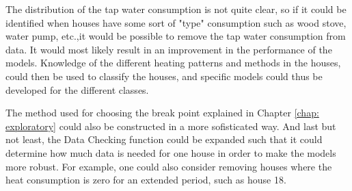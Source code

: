 \noindent The distribution of the tap water consumption is not quite clear, so if it could be identified when houses have some sort of "type" consumption such as wood stove, water pump, etc.,it would be possible to remove the tap water consumption from data. It would most likely result in an improvement in the performance of the models. Knowledge of the different heating patterns and methods in the houses, could then be used to classify the houses, and specific models could thus be developed for the different classes.

\noindent The method used for choosing the break point explained in Chapter \ref{chap: exploratory} could also be constructed in a more sofisticated way. And last but not least, the Data Checking function could be expanded such that it could determine how much data is needed for one house in order to make the models more robust. For example, one could also consider removing houses where the heat consumption is zero for an extended period, such as house 18.
